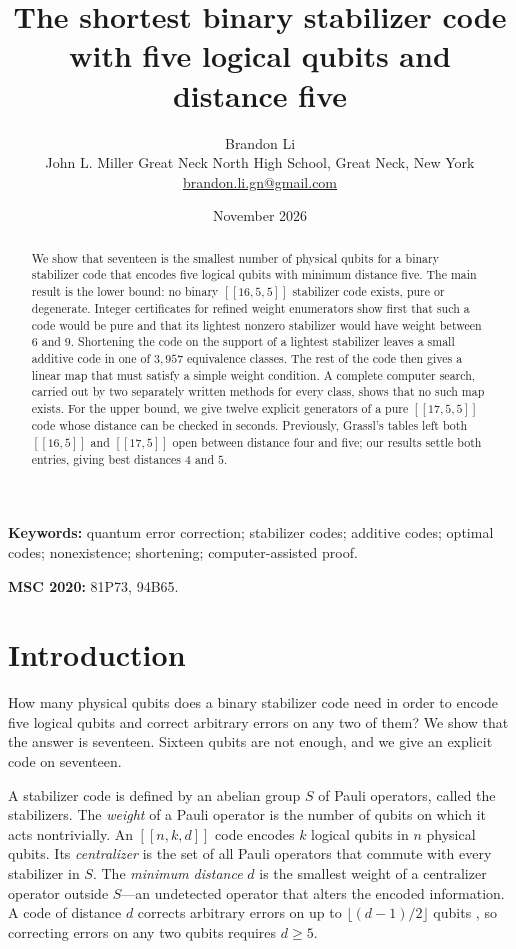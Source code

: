 \documentclass[11pt]{article}
\title{The shortest binary stabilizer code with five logical qubits and distance five}
\author{Brandon Li\\[0.2em]
\normalsize John L. Miller Great Neck North High School, Great Neck, New York\\
\normalsize\href{mailto:brandon.li.gn@gmail.com}{brandon.li.gn@gmail.com}}
\date{November 2026}
\theoremstyle{definition}
\theoremstyle{remark}
\newcommand{\qc}[1]{[\![#1]\!]}
\begin{document}
\maketitle

\begin{abstract}
We show that seventeen is the smallest number of physical qubits for a
binary stabilizer code that encodes five logical qubits with minimum
distance five. The main result is the lower bound: no binary
\(\qc{16,5,5}\) stabilizer code exists, pure or degenerate. Integer
certificates for refined weight enumerators show first that such a code
would be pure and that its lightest nonzero stabilizer would have weight
between \(6\) and \(9\). Shortening the code on the support of a
lightest stabilizer leaves a small additive code in one of \(3{,}957\)
equivalence classes. The rest of the code then gives a linear map that
must satisfy a simple weight condition. A complete computer search,
carried out by two separately written methods for every class, shows
that no such map exists. For the upper bound, we give twelve explicit
generators of a pure \(\qc{17,5,5}\) code whose distance can be checked
in seconds. Previously, Grassl's tables left both \(\qc{16,5}\) and
\(\qc{17,5}\) open between distance four and five; our results settle
both entries, giving best distances \(4\) and \(5\).
\end{abstract}

\noindent\textbf{Keywords:} quantum error correction; stabilizer codes; additive
codes; optimal codes; nonexistence; shortening; computer-assisted proof.

\noindent\textbf{MSC 2020:} 81P73, 94B65.

\section{Introduction}\label{sec:intro}

How many physical qubits does a binary stabilizer code need in order to
encode five logical qubits and correct arbitrary errors on any two of
them? We show that the answer is seventeen. Sixteen qubits are not
enough, and we give an explicit code on seventeen.

A stabilizer code \cite{gottesman,crss97,crss} is defined by an abelian
group \(S\) of Pauli operators, called the stabilizers. The \emph{weight} of a Pauli operator
is the number of qubits on which it acts nontrivially. An \(\qc{n,k,d}\)
code encodes \(k\) logical qubits in \(n\) physical qubits. Its
\emph{centralizer} is the set of all Pauli operators that commute with
every stabilizer in \(S\). The \emph{minimum distance} \(d\) is the
smallest weight of a centralizer operator outside \(S\)---an undetected
operator that alters the encoded information. A code of distance \(d\)
corrects arbitrary errors on up to \(\lfloor (d-1)/2\rfloor\) qubits
\cite{knilllaflamme}, so
correcting errors on any two qubits requires \(d\geq5\).
\end{document}
